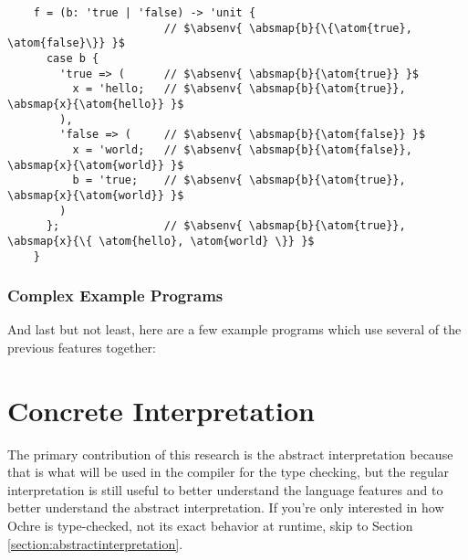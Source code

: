 \documentclass[12pt,twoside]{report}
\begin{document}
\begin{listing}[H]
  \begin{verbatim}
    f = (b: 'true | 'false) -> 'unit {
                        // $\absenv{ \absmap{b}{\{\atom{true}, \atom{false}\}} }$
      case b {
        'true => (      // $\absenv{ \absmap{b}{\atom{true}} }$
          x = 'hello;   // $\absenv{ \absmap{b}{\atom{true}}, \absmap{x}{\atom{hello}} }$
        ),
        'false => (     // $\absenv{ \absmap{b}{\atom{false}} }$
          x = 'world;   // $\absenv{ \absmap{b}{\atom{false}}, \absmap{x}{\atom{world}} }$
          b = 'true;    // $\absenv{ \absmap{b}{\atom{true}}, \absmap{x}{\atom{world}} }$ 
        )
      };                // $\absenv{ \absmap{b}{\atom{true}}, \absmap{x}{\{ \atom{hello}, \atom{world} \}} }$
    }
  \end{verbatim}
  \caption{Each branch of the case statement is abstractly interpreted with  narrowed down to a single atom (lines 4 and 7). Both branches modify , but to different values which make their environments different (lines 5 and 8); these different values are unioned together in the final environment to $\{\atom{hello}, \atom{world}\}$. The false branch happens to mutate  back to $\atom{true}$, which means by the end of \textit{both} branches, $b: \atom{true}$, which is reflected in the final environment which maps  to $\atom{true}$ instead of $\{\atom{true}, \atom{false}\}$.}
\end{listing}

\subsubsection{Complex Example Programs}
And last but not least, here are a few example programs which use several of the previous features together:

\section{Concrete Interpretation}
\label{section:concreteinterpretation}
The primary contribution of this research is the abstract interpretation because that is what will be used in the compiler for the type checking, but the regular interpretation is still useful to better understand the language features and to better understand the abstract interpretation. If you're only interested in how Ochre is type-checked, not its exact behavior at runtime, skip to Section \ref{section:abstractinterpretation}.
\end{document}

